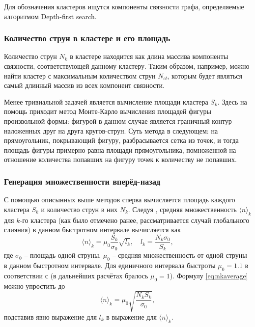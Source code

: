 Для обозначения кластеров ищутся компоненты связности графа, определяемые алгоритмом Depth-first search. 

\subsubsection{Количество струн в кластере и его площадь}
Количество струн $N_k$ в кластере находится как длина массива компоненты связности, соответствующей данному кластеру. Таким образом, например, можно найти кластер с максимальным количеством струн $N_{cl}$, которым будет являться самый длинный массив из всех компонент связности.

Менее тривиальной задачей является вычисление площади кластера $S_k$. Здесь на помощь приходит метод Монте-Карло вычисления площадей фигуры произвольной формы: фигурой в данном случае является граничный контур наложенных друг на друга кругов-струн. Суть метода в следующем: на прямоугольник, покрывающий фигуру, разбрасывается сетка из точек, и тогда площадь фигуры примерно равна площади прямоугольника, помноженной на отношение количества попавших на фигуру точек к количеству не попавших.
\subsubsection{Генерация множественности вперёд-назад}
С помощью описынных выше методов сперва вычисляется площадь каждого кластера $S_k$ и количество струн в них $N_k$. Следуя \cite{MulReduction}, средняя множественность $\langle n \rangle_k$ для $k$-го кластера (как было отмечено ранее, рассматривается случай глобального слияния) в данном быстротном интервале вычисляется как 
\begin{equation} \label{eq:nkaverage}
	\langle n \rangle_k = \mu_0 \frac{S_k}{\sigma_0}\sqrt{l_k}, \quad l_k = \frac{N_k \sigma_0}{S_k},
\end{equation}
где $\sigma_0$ -- площадь одной струны, $\mu_0$ -- средняя множественность от одной струны в данном быстротном интервале. Для единичного интервала быстроты $\mu_0 = 1.1$ в соответствии с \cite{Mu0} (в дальнейших расчётах бралось $\mu_0 = 1$). Формулу \ref{eq:nkaverage} можно упростить до 
\begin{equation} \label{eq:nksimple}
	\langle n \rangle_k = \mu_0 \sqrt{\frac{N_k S_k}{\sigma_0}},
\end{equation}
подставив явно выражение для $l_k$ в выражение для $\langle n \rangle_k$.

